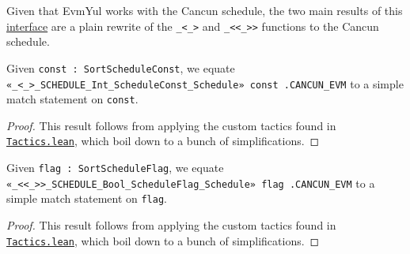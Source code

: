 Given that EvmYul works with the Cancun schedule, the two main results of this
\href{https://runtimeverification.github.io/evm-equivalence/docs/EvmEquivalence/Interfaces/GasInterface.html}{interface}
are a plain rewrite of the \texttt{_<_>} and \texttt{_<<_>>} functions to the
Cancun schedule.

\begin{theorem}
\label{thm:cancun_def}\leanok{}
Given \texttt{const : SortScheduleConst}, we equate
\texttt{«_<_>_SCHEDULE_Int_ScheduleConst_Schedule» const .CANCUN_EVM} to a
simple match statement on \texttt{const}.
\end{theorem}
\begin{proof}
\leanok
This result follows from applying the custom tactics found in
\href{https://runtimeverification.github.io/evm-equivalence/docs/EvmEquivalence/Interfaces/Tactics.html}{\texttt{Tactics.lean}},
which boil down to a bunch of simplifications.
\end{proof}

\begin{theorem}
\label{thm:flag_cancun_def}\leanok{}
Given \texttt{flag : SortScheduleFlag}, we equate
\texttt{«_<<_>>_SCHEDULE_Bool_ScheduleFlag_Schedule» flag .CANCUN_EVM} to a
simple match statement on \texttt{flag}.
\end{theorem}
\begin{proof}
\leanok
This result follows from applying the custom tactics found in
\href{https://runtimeverification.github.io/evm-equivalence/docs/EvmEquivalence/Interfaces/Tactics.html}{\texttt{Tactics.lean}},
which boil down to a bunch of simplifications.
\end{proof}

